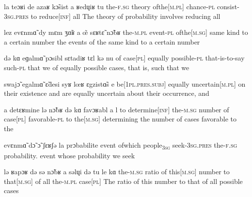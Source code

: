 
              {la teɔʁi de azaʁ {k\~{ɔ}sist\liaison} a ʁedɥiʁ tu}
              {the-\textsc{f}.\textsc{sg} theory {of{\textunderscore}the[\textsc{m}.\textsc{pl}]} chance-\textsc{pl} consist-3\textsc{sg}.\textsc{pres} to {reduce[\textsc{inf}]} all}
              {The theory of probability involves  reducing all}

              {{lez\liaison} evɛnm\~{ɑ} dy mɛm {ʒ\~{ɑ}ʁ\liaison} a \~{œ} sɛʁt\~{ɛ} n\~{ɔ}bʁ}
              {the-\textsc{m}.\textsc{pl} event-\textsc{pl} {of{\textunderscore}the[\textsc{m}.\textsc{sg}]} same kind to a certain number}
              {the events of the same kind to a certain number}

              {də kɑ eɡalm\~{ɑ} pɔsibl sɛtadiʁ tɛl kə nu}
              {of {case[\textsc{pl}]} equally possible-\textsc{pl} that-is-to-say such-\textsc{pl} that we}
              {of equally possible cases, that is, such that we}

              {swaj\~{ɔ} egalm\~{ɑ} \~{ɛ}desi syʁ {lœʁ\liaison} ɛgzist\~{ɑ}s e}
              {{be[1\textsc{pl}.\textsc{pres}.\textsc{subj}]} equally {uncertain[\textsc{m}.\textsc{pl}]} on their existence and}
              {are equally uncertain about their occurrence, and}

              {a detɛʁmine lə n\~{ɔ}bʁ də kɑ {favɔʁabl\liaison} a {l{\liaison}}}
              {to {determine[\textsc{inf}]} the-\textsc{m}.\textsc{sg} number of {case[\textsc{pl}]} favorable-\textsc{pl} to {the[\textsc{m}.\textsc{sg}]}}
              { determining the number of cases favorable to the}

              {evɛnm\~{ɑ} d\~{ɔ} \~{ɔ} ʃɛʁʃə la prɔbabilite}
              {event of{\textunderscore}which {people\textsubscript{3\textsc{sg}}} seek-3\textsc{sg}.\textsc{pres} {the-\textsc{f}.\textsc{sg}} probability.}
              {event whose probability we seek  }

              {lə ʁapɔʁ də sə {n\~{ɔ}bʁ{\liaison}} a səlɥi də tu le kɑ}
              {the-\textsc{m}.\textsc{sg} ratio of {this[\textsc{m}.\textsc{sg}]} number to {that[\textsc{m}.\textsc{sg}]} of all {the-\textsc{m}.\textsc{pl}} {case[\textsc{pl}]}}
              {The ratio of this number to that of all possible cases}

